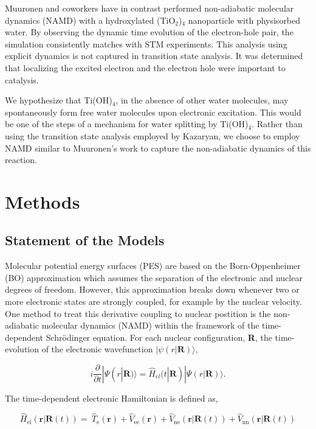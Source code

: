 \documentclass[11pt]{article}
\begin{document}
Muuronen and coworkers have in contrast performed non-adiabatic
molecular dynamics (NAMD) with a hydroxylated (TiO$_2$)$_4$
nanoparticle with physisorbed water.\cite{C6SC04378J} By
observing the dynamic time evolution of the electron-hole pair,
the simulation consistently matches with STM experiments. This
analysis using explicit dynamics is not captured in transition
state analysis. It was determined that localizing the excited
electron and the electron hole were important to catalysis.

We hypothesize that Ti(OH)$_4$, in the absence of other water
molecules, may spontaneously form free water molecules upon
electronic excitation. This would be 
one of the steps of a mechanism for water splitting by
Ti(OH)$_4$.
Rather than using the transition
state analysis employed by Kazaryan, we choose to employ
NAMD similar to Muuronen's work to capture the
non-adiabatic dynamics of this reaction.

\section{Methods}

\subsection{Statement of the Models}

Molecular potential energy surfaces (PES) are based on the Born-Oppenheimer (BO)
approximation which assumes the separation of the electronic and nuclear degrees
of freedom. However, this approximation breaks down whenever two or more
electronic states are strongly coupled\cite{C3CP51514A}, for
example by the nuclear velocity. One method to treat this
derivative coupling to nuclear postition
 is the non-adiabatic molecular dynamics (NAMD) within
the framework of the time-dependent Schr\"odinger equation. For each
nuclear configuration, \textbf{R}, the time-evolution of the electronic
wavefunction $|\psi(r|\textbf{R})\rangle$,

\begin{equation}
  i \frac{\partial}{\partial t}|\Psi(r|\textbf{R})\rangle
      = \hat{H}_{el}(t|\textbf{R})|\Psi(r|\textbf{R})\rangle.
\end{equation}

The time-dependent electronic Hamiltonian is defined as,

\begin{equation}
  \hat{H}_{\text{el}}(\textbf{r}|\textbf{R}(t)) = \
\hat{T}_{\text{e}}(\textbf{r}) +
\hat{V}_{\text{ee}}(\textbf{r}) + 
\hat{V}_{\text{ne}}(\textbf{r}|\textbf{R}(t))  + 
\hat{V}_{\text{nn}}(\textbf{r}|\textbf{R}(t))
\end{equation}
\end{document}
